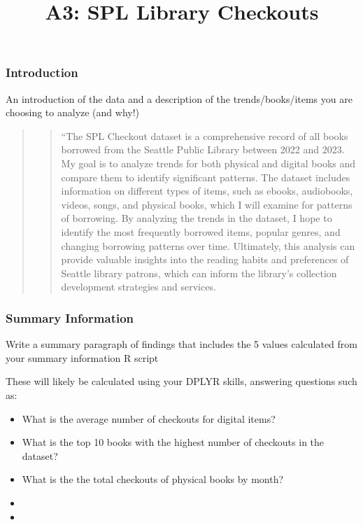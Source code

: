 \documentclass[
]{article}
\title{A3: SPL Library Checkouts}
\author{}
\date{\vspace{-2.5em}}
\providecommand{\tightlist}{%
  \setlength{\itemsep}{0pt}\setlength{\parskip}{0pt}}
\begin{document}
\maketitle

\hypertarget{introduction}{%
\subsubsection{Introduction}\label{introduction}}

An introduction of the data and a description of the trends/books/items
you are choosing to analyze (and why!)

\begin{quote}
\begin{quote}
``The SPL Checkout dataset is a comprehensive record of all books
borrowed from the Seattle Public Library between 2022 and 2023. My goal
is to analyze trends for both physical and digital books and compare
them to identify significant patterns. The dataset includes information
on different types of items, such as ebooks, audiobooks, videos, songs,
and physical books, which I will examine for patterns of borrowing. By
analyzing the trends in the dataset, I hope to identify the most
frequently borrowed items, popular genres, and changing borrowing
patterns over time. Ultimately, this analysis can provide valuable
insights into the reading habits and preferences of Seattle library
patrons, which can inform the library's collection development
strategies and services.
\end{quote}
\end{quote}

\hypertarget{summary-information}{%
\subsubsection{Summary Information}\label{summary-information}}

Write a summary paragraph of findings that includes the 5 values
calculated from your summary information R script

These will likely be calculated using your DPLYR skills, answering
questions such as:

\begin{itemize}
\tightlist
\item
  What is the average number of checkouts for digital items?
\item
  What is the top 10 books with the highest number of checkouts in the
  dataset?
\item
  What is the the total checkouts of physical books by month?
\item
\item
\end{itemize}
\end{document}
